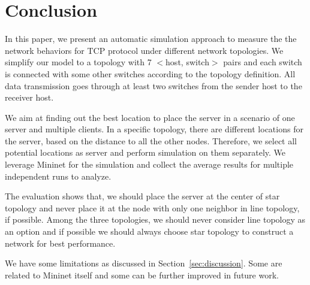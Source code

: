 \section{Conclusion} \label{sec:conclusion}

In this paper, we present an automatic simulation approach to measure the 
the network behaviors for TCP protocol under different network topologies. 
We simplify our model to a topology with 7 $<$host, switch$>$ pairs and 
each switch is connected with some other switches according to the topology definition.
All data transmission goes through at least two switches from the sender 
host to the receiver host. 

We aim at finding out the best location to place the server in a scenario of one server 
and multiple clients. In a specific topology, there are different locations
for the server, based on the distance to all the other nodes. Therefore, we 
select all potential locations as server and perform simulation on them separately.
We leverage Mininet for the simulation and collect the average results 
for multiple independent runs to analyze. 

The evaluation shows that, we should place the server at the center 
of star topology and never place it at the node with only one neighbor 
in line topology, if possible. Among the three topologies, we should never 
consider line topology as an option and if possible we should always choose 
star topology to construct a network for best performance.

We have some limitations as discussed in Section~\ref{sec:discussion}. Some 
are related to Mininet itself and some can be further improved in future work.
